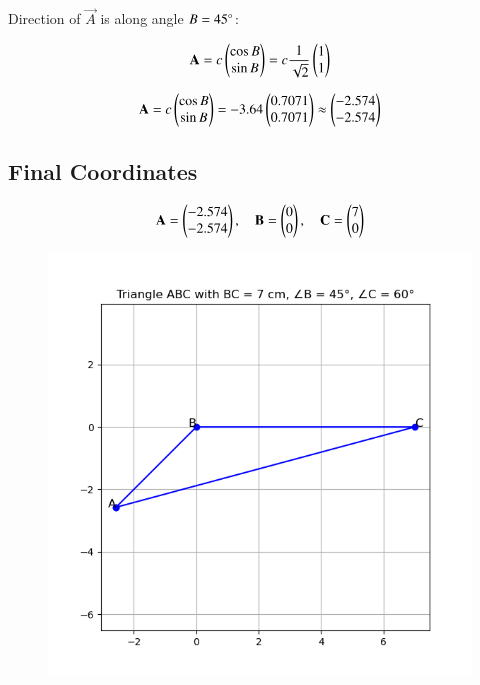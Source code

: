 \documentclass{article}
\begin{document}
Direction of $\vec{A}$ is along angle $B = 45\degree$:


\begin{align}
\mathbf{A} = c \begin{pmatrix}\cos B \\ \sin B\end{pmatrix}
= c \frac{1}{\sqrt{2}} \begin{pmatrix}1 \\ 1\end{pmatrix}
\end{align}

\begin{align}
\mathbf{A} = c \begin{pmatrix}\cos B \\ \sin B\end{pmatrix} = -3.64 \begin{pmatrix}0.7071 \\ 0.7071\end{pmatrix} \approx \begin{pmatrix}-2.574 \\ -2.574\end{pmatrix}
\end{align}

\subsection*{Final Coordinates}


\begin{align}
\mathbf{A} = \begin{pmatrix}-2.574 \\ -2.574\end{pmatrix}, \quad
\mathbf{B} = \begin{pmatrix}0 \\ 0\end{pmatrix}, \quad
\mathbf{C} = \begin{pmatrix}7 \\ 0\end{pmatrix}
\end{align}


\begin{figure}[H]
    \centering
    \includegraphics[width=0.7\linewidth]{./figs/Figure_1.png}
    \caption{}
    \label{fig:fig1}
\end{figure}
\end{document}
